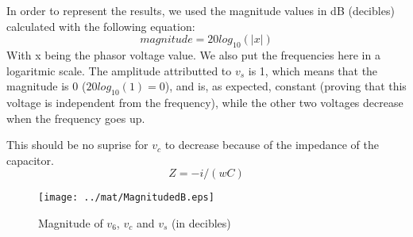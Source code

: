 In order to represent the results, we used the magnitude values in dB (decibles) calculated with the following equation:
\begin{equation}
magnitude = 20log_{10}(|x|)
\label{eq:1.21}
\end{equation}
With x being the phasor voltage value. 
We also put the frequencies here in a logaritmic scale. The amplitude attributted to $v_s$ is 1, which means that the magnitude is 0 ($20log_{10}(1)=0$), and is, as expected, constant (proving that this voltage is independent from the frequency), while the other two voltages decrease when the frequency goes up. 

This should be no suprise for $v_c$ to decrease because of the impedance of the capacitor.
\begin{equation}
Z = -i/(wC)
\label{eq:1.22}
\end{equation}

\begin{figure}[H] \centering
\texttt{[image: ../mat/MagnitudedB.eps]}
\caption{Magnitude of $v_6$, $v_c$ and $v_s$ (in decibles)}
\label{fig:mat5ps}
\end{figure}




